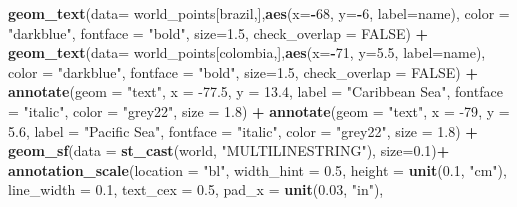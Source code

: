 \documentclass[12pt,oneside]{reedthesis}
\newenvironment{Shaded}{\begin{snugshade}}{\end{snugshade}}
\newcommand{\DataTypeTok}[1]{\textcolor[rgb]{0.13,0.29,0.53}{#1}}
\newcommand{\DecValTok}[1]{\textcolor[rgb]{0.00,0.00,0.81}{#1}}
\newcommand{\FloatTok}[1]{\textcolor[rgb]{0.00,0.00,0.81}{#1}}
\newcommand{\KeywordTok}[1]{\textcolor[rgb]{0.13,0.29,0.53}{\textbf{#1}}}
\newcommand{\NormalTok}[1]{#1}
\newcommand{\OperatorTok}[1]{\textcolor[rgb]{0.81,0.36,0.00}{\textbf{#1}}}
\newcommand{\OtherTok}[1]{\textcolor[rgb]{0.56,0.35,0.01}{#1}}
\newcommand{\StringTok}[1]{\textcolor[rgb]{0.31,0.60,0.02}{#1}}
\begin{document}
\begin{Shaded}
\begin{Highlighting}[]
\StringTok{  }\KeywordTok{geom_text}\NormalTok{(}\DataTypeTok{data=}\NormalTok{ world_points[brazil,],}\KeywordTok{aes}\NormalTok{(}\DataTypeTok{x=}\OperatorTok{-}\DecValTok{68}\NormalTok{, }\DataTypeTok{y=}\OperatorTok{-}\DecValTok{6}\NormalTok{, }\DataTypeTok{label=}\NormalTok{name), }\DataTypeTok{color =} \StringTok{"darkblue"}\NormalTok{, }\DataTypeTok{fontface =} \StringTok{"bold"}\NormalTok{, }\DataTypeTok{size=}\FloatTok{1.5}\NormalTok{, }\DataTypeTok{check_overlap =} \OtherTok{FALSE}\NormalTok{) }\OperatorTok{+}
\StringTok{  }\KeywordTok{geom_text}\NormalTok{(}\DataTypeTok{data=}\NormalTok{ world_points[colombia,],}\KeywordTok{aes}\NormalTok{(}\DataTypeTok{x=}\OperatorTok{-}\DecValTok{71}\NormalTok{, }\DataTypeTok{y=}\FloatTok{5.5}\NormalTok{, }\DataTypeTok{label=}\NormalTok{name), }\DataTypeTok{color =} \StringTok{"darkblue"}\NormalTok{, }\DataTypeTok{fontface =} \StringTok{"bold"}\NormalTok{, }\DataTypeTok{size=}\FloatTok{1.5}\NormalTok{, }\DataTypeTok{check_overlap =} \OtherTok{FALSE}\NormalTok{) }\OperatorTok{+}
\StringTok{  }\KeywordTok{annotate}\NormalTok{(}\DataTypeTok{geom =} \StringTok{"text"}\NormalTok{, }\DataTypeTok{x =} \FloatTok{-77.5}\NormalTok{, }\DataTypeTok{y =} \FloatTok{13.4}\NormalTok{, }\DataTypeTok{label =} \StringTok{"Caribbean Sea"}\NormalTok{, }\DataTypeTok{fontface =} \StringTok{"italic"}\NormalTok{, }\DataTypeTok{color =} \StringTok{"grey22"}\NormalTok{, }\DataTypeTok{size =} \FloatTok{1.8}\NormalTok{) }\OperatorTok{+}\StringTok{ }
\StringTok{  }\KeywordTok{annotate}\NormalTok{(}\DataTypeTok{geom =} \StringTok{"text"}\NormalTok{, }\DataTypeTok{x =} \DecValTok{-79}\NormalTok{, }\DataTypeTok{y =} \FloatTok{5.6}\NormalTok{, }\DataTypeTok{label =} \StringTok{"Pacific Sea"}\NormalTok{, }\DataTypeTok{fontface =} \StringTok{"italic"}\NormalTok{, }\DataTypeTok{color =} \StringTok{"grey22"}\NormalTok{, }\DataTypeTok{size =} \FloatTok{1.8}\NormalTok{) }\OperatorTok{+}
\StringTok{  }\KeywordTok{geom_sf}\NormalTok{(}\DataTypeTok{data =} \KeywordTok{st_cast}\NormalTok{(world, }\StringTok{"MULTILINESTRING"}\NormalTok{), }\DataTypeTok{size=}\FloatTok{0.1}\NormalTok{)}\OperatorTok{+}
\StringTok{  }\KeywordTok{annotation_scale}\NormalTok{(}\DataTypeTok{location =} \StringTok{"bl"}\NormalTok{, }\DataTypeTok{width_hint =} \FloatTok{0.5}\NormalTok{, }\DataTypeTok{height =} \KeywordTok{unit}\NormalTok{(}\FloatTok{0.1}\NormalTok{, }\StringTok{"cm"}\NormalTok{), }\DataTypeTok{line_width =} \FloatTok{0.1}\NormalTok{, }\DataTypeTok{text_cex =} \FloatTok{0.5}\NormalTok{, }\DataTypeTok{pad_x =} \KeywordTok{unit}\NormalTok{(}\FloatTok{0.03}\NormalTok{, }\StringTok{"in"}\NormalTok{), }

\end{Highlighting}
\end{Shaded}
\end{document}
